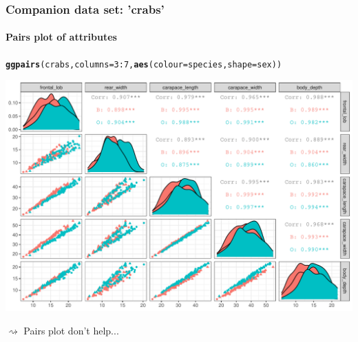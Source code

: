 \documentclass{beamer}\usepackage[]{graphicx}\usepackage[]{color}
\makeatletter
\newcommand{\hlnum}[1]{\textcolor[rgb]{0.686,0.059,0.569}{#1}}%
\newcommand{\hlopt}[1]{\textcolor[rgb]{0,0,0}{#1}}%
\newcommand{\hlstd}[1]{\textcolor[rgb]{0.345,0.345,0.345}{#1}}%
\newcommand{\hlkwc}[1]{\textcolor[rgb]{0.333,0.667,0.333}{#1}}%
\newcommand{\hlkwd}[1]{\textcolor[rgb]{0.737,0.353,0.396}{\textbf{#1}}}%
\newenvironment{kframe}{%
 \def\at@end@of@kframe{}%
 \ifinner\ifhmode%
  \def\at@end@of@kframe{\end{minipage}}%
  \begin{minipage}{\columnwidth}%
 \fi\fi%
 \def\FrameCommand##1{\hskip\@totalleftmargin \hskip-\fboxsep
 \colorbox{shadecolor}{##1}\hskip-\fboxsep
     \hskip-\linewidth \hskip-\@totalleftmargin \hskip\columnwidth}%
 \MakeFramed {\advance\hsize-\width
   \@totalleftmargin\z@ \linewidth\hsize
   \@setminipage}}%
 {\par\unskip\endMakeFramed%
 \at@end@of@kframe}
\newenvironment{knitrout}{}{} %
\makeatother
\begin{document}
\begin{frame}[fragile]
  \frametitle{Companion data set: 'crabs'}
  \framesubtitle{Pairs plot of attributes}

\begin{knitrout}\scriptsize
{}\color{fgcolor}\begin{kframe}
\begin{alltt}
\hlkwd{ggpairs}\hlstd{(crabs,} \hlkwc{columns} \hlstd{=} \hlnum{3}\hlopt{:}\hlnum{7}\hlstd{,} \hlkwd{aes}\hlstd{(}\hlkwc{colour} \hlstd{= species,} \hlkwc{shape} \hlstd{= sex))}
\end{alltt}
\end{kframe}
\includegraphics[width=.8\textwidth]{figures/crabs_attributes-1} 

\end{knitrout}
$\rightsquigarrow$ Pairs plot don't help...
\end{frame}
\end{document}
